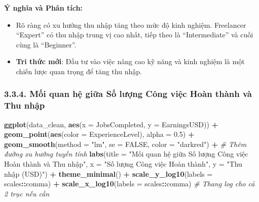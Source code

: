 \documentclass[
]{article}
\newenvironment{Shaded}{\begin{snugshade}}{\end{snugshade}}
\newcommand{\AttributeTok}[1]{\textcolor[rgb]{0.13,0.29,0.53}{#1}}
\newcommand{\CommentTok}[1]{\textcolor[rgb]{0.56,0.35,0.01}{\textit{#1}}}
\newcommand{\ConstantTok}[1]{\textcolor[rgb]{0.56,0.35,0.01}{#1}}
\newcommand{\FloatTok}[1]{\textcolor[rgb]{0.00,0.00,0.81}{#1}}
\newcommand{\FunctionTok}[1]{\textcolor[rgb]{0.13,0.29,0.53}{\textbf{#1}}}
\newcommand{\NormalTok}[1]{#1}
\newcommand{\SpecialCharTok}[1]{\textcolor[rgb]{0.81,0.36,0.00}{\textbf{#1}}}
\newcommand{\StringTok}[1]{\textcolor[rgb]{0.31,0.60,0.02}{#1}}
\begin{document}
\textbf{Ý nghĩa và Phân tích:}

\begin{itemize}
\item
  Rõ ràng có xu hướng thu nhập tăng theo mức độ kinh nghiệm. Freelancer
  ``Expert'' có thu nhập trung vị cao nhất, tiếp theo là
  ``Intermediate'' và cuối cùng là ``Beginner''.
\item
  \textbf{Tri thức mới}: Đầu tư vào việc nâng cao kỹ năng và kinh nghiệm
  là một chiến lược quan trọng để tăng thu nhập.
\end{itemize}

\subsubsection{3.3.4. Mối quan hệ giữa Số lượng Công việc Hoàn thành và
Thu
nhập}\label{mux1ed1i-quan-hux1ec7-giux1eefa-sux1ed1-lux1b0ux1ee3ng-cuxf4ng-viux1ec7c-houxe0n-thuxe0nh-vuxe0-thu-nhux1eadp}

\begin{Shaded}
\begin{Highlighting}[]
\FunctionTok{ggplot}\NormalTok{(data\_clean, }\FunctionTok{aes}\NormalTok{(}\AttributeTok{x =}\NormalTok{ JobsCompleted, }\AttributeTok{y =}\NormalTok{ EarningsUSD)) }\SpecialCharTok{+}
  \FunctionTok{geom\_point}\NormalTok{(}\FunctionTok{aes}\NormalTok{(}\AttributeTok{color =}\NormalTok{ ExperienceLevel), }\AttributeTok{alpha =} \FloatTok{0.5}\NormalTok{) }\SpecialCharTok{+}
  \FunctionTok{geom\_smooth}\NormalTok{(}\AttributeTok{method =} \StringTok{"lm"}\NormalTok{, }\AttributeTok{se =} \ConstantTok{FALSE}\NormalTok{, }\AttributeTok{color =} \StringTok{"darkred"}\NormalTok{) }\SpecialCharTok{+} \CommentTok{\# Thêm đường xu hướng tuyến tính}
  \FunctionTok{labs}\NormalTok{(}\AttributeTok{title =} \StringTok{"Mối quan hệ giữa Số lượng Công việc Hoàn thành và Thu nhập"}\NormalTok{,}
       \AttributeTok{x =} \StringTok{"Số lượng Công việc Hoàn thành"}\NormalTok{,}
       \AttributeTok{y =} \StringTok{"Thu nhập (USD)"}\NormalTok{) }\SpecialCharTok{+}
  \FunctionTok{theme\_minimal}\NormalTok{() }\SpecialCharTok{+}
  \FunctionTok{scale\_y\_log10}\NormalTok{(}\AttributeTok{labels =}\NormalTok{ scales}\SpecialCharTok{::}\NormalTok{comma) }\SpecialCharTok{+}
  \FunctionTok{scale\_x\_log10}\NormalTok{(}\AttributeTok{labels =}\NormalTok{ scales}\SpecialCharTok{::}\NormalTok{comma) }\CommentTok{\# Thang log cho cả 2 trục nếu cần}
\end{Highlighting}
\end{Shaded}
\end{document}
